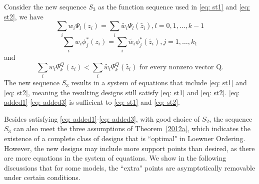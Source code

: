 \documentclass[12pt]{amsart}
\newtheorem{lemma}[theorem]{Lemma}
\theoremstyle{definition}
\theoremstyle{remark}
\numberwithin{equation}{section}
\begin{document}
Consider the new sequence $S_3$ as the function sequence used in \eqref{eq: st1} and \eqref{eq: st2}, we have \begin{equation}\label{eq: added1}
\sum_{i}w_i\Psi_l(z_i)=\sum_{i}\tilde{w_i}\Psi_l(\tilde{z_i}), l=0,1,\ldots, k-1    
\end{equation}
\begin{equation}\label{eq: added2}
\sum_{i}w_i\phi_j^*(z_i)=\sum_{i}\tilde{w_i}\phi_j^*(\tilde{z_i}), j=1,\ldots, k_1    
\end{equation}and \begin{equation}\label{eq: added3}
\sum_{i}w_i\Psi_k^Q(z_i)<\sum_{i}\tilde{w_i}\Psi_k^Q(\tilde{z_i}) \text{  for every nonzero vector Q}.
\end{equation}
The new sequence $S_3$ results in a system of equations that include \eqref{eq: st1} and \eqref{eq: st2}, meaning the resulting designs still satisfy \eqref{eq: st1} and \eqref{eq: st2}. \eqref{eq: added1}-\eqref{eq: added3} is sufficient to \eqref{eq: st1} and \eqref{eq: st2}.






Besides satisfying \eqref{eq: added1}-\eqref{eq: added3}, with good choice of $S_2$, the sequence $S_3$ can also meet the three assumptions of Theorem~\ref{2012a}, which indicates the existence of a complete class of designs that is ``optimal" in Loewner Ordering. However, the new designs may include more support points than desired, as there are more equations in the system of equations. We show in the following discussions that for some models, the ``extra" points are asymptotically removable under certain conditions.

\end{document}
